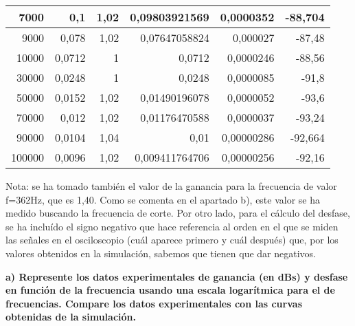 \documentclass{article}
\begin{document}
\begin{table}[h!]
\begin{tabular}{|r|r|r|r|r|r|}
7000                                 & 0,1                            & 1,02                          & 0,09803921569              & 0,0000352                          & -88,704     \\ \hline
9000                                 & 0,078                          & 1,02                          & 0,07647058824              & 0,000027                           & -87,48      \\ \hline
10000                                & 0,0712                         & 1                             & 0,0712                     & 0,0000246                          & -88,56      \\ \hline
30000                                & 0,0248                         & 1                             & 0,0248                     & 0,0000085                          & -91,8       \\ \hline
50000                                & 0,0152                         & 1,02                          & 0,01490196078              & 0,0000052                          & -93,6       \\ \hline
70000                                & 0,012                          & 1,02                          & 0,01176470588              & 0,0000037                          & -93,24      \\ \hline
90000                                & 0,0104                         & 1,04                          & 0,01                       & 0,00000286                         & -92,664    \\ \hline
100000                               & 0,0096                         & 1,02                          & 0,009411764706             & 0,00000256                         & -92,16    \\ \hline
\end{tabular}
\end{table}

Nota: se ha tomado también el valor de la ganancia para la frecuencia de valor f=362Hz, que es 1,40. Como se comenta en el apartado b), este valor se ha medido buscando la frecuencia de corte. Por otro lado, para el cálculo del desfase, se ha incluído el signo negativo que hace referencia al orden en el que se miden las señales en el osciloscopio (cuál aparece primero y cuál después) que, por los valores obtenidos en la simulación, sabemos que tienen que dar negativos.

\bigskip
\textbf{a) Represente los datos experimentales de ganancia (en dBs) y desfase en función de la
frecuencia usando una escala logarítmica para el de frecuencias. Compare los datos
experimentales con las curvas obtenidas de la simulación.}
\end{document}
